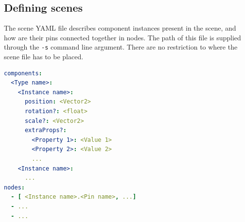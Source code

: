 
\subsection{Defining scenes} \label{subsec:scene_spec}
The scene YAML file describes component instances present in the scene, and how are their pins connected together in nodes. The path of this file is supplied through the \texttt{-s} command line argument. There are no restriction to where the scene file has to be placed.

\begin{lstlisting}[language=yaml, caption={YAML scene file structure}]
components:
  <Type name>:
    <Instance name>:
      position: <Vector2>
      rotation?: <float>
      scale?: <Vector2>
      extraProps?:
        <Property 1>: <Value 1>
        <Property 2>: <Value 2>
        ...
    <Instance name>:
      ...
nodes:
  - [ <Instance name>.<Pin name>, ...]
  - ...
  - ...
\end{lstlisting}

